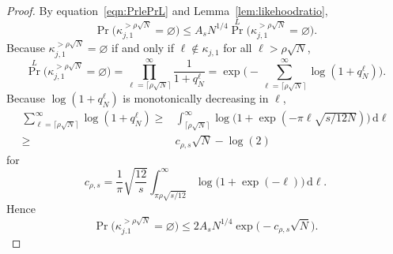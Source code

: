 \documentclass{article}
\theoremstyle{definition}
\renewcommand{\leq}{\leqslant}
\renewcommand{\geq}{\geqslant}
\renewcommand{\emptyset}{\varnothing}
\newcommand{\rd}{\,\mathrm{d}}
\begin{document}
\begin{proof}
    By equation~\eqref{eqn:PrlePrL} and Lemma~\ref{lem:likehoodratio},
$$\Pr\Big(\kappa^{>\rho \sqrt{N}}_{j,1}=\emptyset\Big)\leq A_s N^{1/4}{\textstyle\Pr}^L\Big(\kappa^{>\rho \sqrt{N}}_{j,1}=\emptyset\Big).$$
Because $\kappa^{>\rho \sqrt{N}}_{j,1}=\emptyset$ if and only if $\ell\notin \kappa_{j,1}$ for all $\ell>\rho\sqrt{N}$, 
$${\textstyle\Pr}^L\Big(\kappa^{>\rho \sqrt{N}}_{j,1}=\emptyset\Big)=\prod_{\ell=\lceil\rho\sqrt{N}\rceil}^\infty\frac{1}{1+q^\ell_N}=\exp\Big(-\sum_{\ell=\lceil\rho\sqrt{N}\rceil}^\infty\log(1+q^\ell_N)\Big).$$
Because $\log(1+q^\ell_N)$ is monotonically decreasing in $\ell$, 
\begin{align}\label{eqn:crhobound}
        \sum_{\ell=\lceil\rho\sqrt{N}\rceil}^\infty \log(1+q^\ell_N)
        \geq&\int_{\lceil\rho\sqrt{N}\rceil}^\infty \log\Big(1+\exp(-\pi\ell\sqrt{s/12N})\Big)\rd \ell \\
        \geq &c_{\rho,s}\sqrt{N}-\log(2) \nonumber
    \end{align}
for 
\begin{equation*}
c_{\rho,s}=\frac{1}{\pi}\sqrt{\frac{12}{s}}\int_{\pi\rho\sqrt{s/12}}^\infty \log\Big(1+\exp(-\ell)\Big)\rd \ell.
\end{equation*}
Hence
$$\Pr\Big(\kappa^{>\rho \sqrt{N}}_{j.1}=\emptyset\Big)\leq 2A_s N^{1/4}\exp\Big(-c_{\rho,s}\sqrt{N}\Big).$$


\end{proof}
\end{document}

